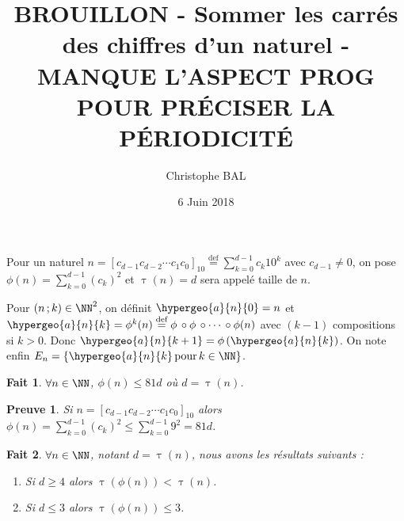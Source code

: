 \documentclass[12pt]{amsart}
\DeclareMathOperator{\taille}{\tau}
\newtheorem{fact}{Fait}
\newtheorem*{proof*}{Preuve}
\begin{document}
\title{BROUILLON - Sommer les carrés des chiffres d'un naturel - MANQUE L'ASPECT PROG POUR PRÉCISER LA PÉRIODICITÉ}
\author{Christophe BAL}
\date{6 Juin 2018}
\maketitle

Pour un naturel 
$\displaystyle      n = [c_{d-1} c_{d-2} \cdots c_1 c_0]_{10} 
\stackrel{\text{def}}{=} \sum_{k=0}^{d-1} c_k 10^k$
avec $c_{d-1} \neq 0$,
on pose
$\displaystyle \phi(n) = \sum_{k=0}^{d-1} (c_k)^2$
et
$\taille(n) = d$ sera appelé taille de $n$.

\medskip

Pour $(n \,; k) \in \NN^2$, on définit 
$  \hypergeo{a}{n}{0} = n$
et
$  \hypergeo{a}{n}{k} = \phi^k(n)
\stackrel{\text{def}}{=} \phi \,\circ \phi \,\circ \cdots \,\circ \phi(n)$ avec $(k-1)$ compositions si $k > 0$.
Donc
$\hypergeo{a}{n}{k+1} = \phi \left( \hypergeo{a}{n}{k} \right)$.
On note enfin
$E_n = \{ \hypergeo{a}{n}{k} \, \text{pour} \, k \in \NN \}$.



\medskip

\begin{fact}
	$\forall n \in \NN$, $\phi(n) \leqslant 81 d$ où $d = \taille(n)$.
\end{fact}

\begin{proof*}
	Si $n = [c_{d-1} c_{d-2} \cdots c_1 c_0]_{10}$
	alors 
	$\displaystyle \phi(n) = \sum_{k=0}^{d-1} (c_k)^2 \leqslant \sum_{k=0}^{d-1} 9^2 = 81 d $.
\end{proof*}



\medskip

\begin{fact}
	$\forall n \in \NN$, notant $d = \taille(n)$, nous avons les résultats suivants :
	
	\begin{enumerate}
		\item Si $d \geqslant 4$ alors $\taille(\phi(n)) < \taille(n)$.
		
		\item Si $d \leqslant 3$ alors $\taille(\phi(n)) \leqslant 3$.
	\end{enumerate}
\end{fact}
\end{document}
